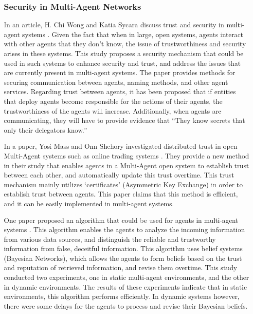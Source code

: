 \documentclass[runningheads,a4paper]{llncs}
\begin{document}
\subsubsection{Security in Multi-Agent Networks}
In an article, H. Chi Wong and Katia Sycara discuss trust and security in multi-agent systems \cite{wong2000adding}. Given the fact that when in large, open systems, agents interact with other agents that they don't know, the issue of trustworthiness and security arises in these systems. This study proposes a security mechanism that could be used in such systems to enhance security and trust, and address the issues that are currently present in multi-agent systems. The paper provides methods for securing communication between agents, naming methods, and other agent services. Regarding trust between agents, it has been proposed that if entities that deploy agents become responsible for the actions of their agents, the trustworthiness of the agents will increase. Additionally, when agents are communicating, they will have to provide evidence that ``They know secrets that only their delegators know.''


In a paper, Yosi Mass and Onn Shehory investigated distributed trust in open Multi-Agent systems such as online trading systems \cite{mass2001distributed}. They provide a new method in their study that enables agents in a Multi-Agent open system to establish trust between each other, and automatically update this trust overtime. This trust mechanism mainly utilizes `certificates' (Asymmetric Key Exchange) in order to establish trust between agents. This paper claims that this method is efficient, and it can be easily implemented in multi-agent systems.

One paper proposed an algorithm that could be used for agents in multi-agent systems \cite{barber2001belief}. This algorithm enables the agents to analyze the incoming information from various data sources, and distinguish the reliable and trustworthy information from false, deceitful information. This algorithm uses belief systems (Bayesian Networks), which allows the agents to form beliefs based on the trust and reputation of retrieved information, and revise them overtime. This study conducted two experiments, one in static multi-agent environments, and the other in dynamic environments. The results of these experiments indicate that in static environments, this algorithm performs efficiently. In dynamic systems however, there were some delays for the agents to process and revise their Bayesian beliefs.
\end{document}
